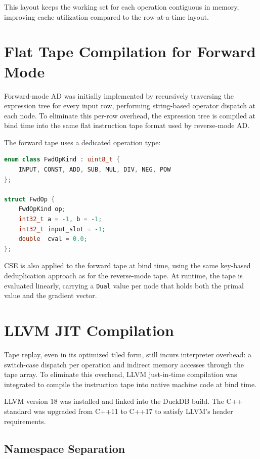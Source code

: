 \documentclass[12pt]{report}
\begin{document}
This layout keeps the working set for each operation contiguous in memory,
improving cache utilization compared to the row-at-a-time layout.

\section{Flat Tape Compilation for Forward Mode}

Forward-mode AD was initially implemented by recursively traversing the
expression tree for every input row, performing string-based operator dispatch
at each node. To eliminate this per-row overhead, the expression tree is
compiled at bind time into the same flat instruction tape format used by
reverse-mode AD.

The forward tape uses a dedicated operation type:

\begin{lstlisting}[language=C++]
enum class FwdOpKind : uint8_t {
    INPUT, CONST, ADD, SUB, MUL, DIV, NEG, POW
};

struct FwdOp {
    FwdOpKind op;
    int32_t a = -1, b = -1;
    int32_t input_slot = -1;
    double  cval = 0.0;
};
\end{lstlisting}

CSE is also applied to the forward tape at bind time, using the same key-based
deduplication approach as for the reverse-mode tape. At runtime, the tape is
evaluated linearly, carrying a \texttt{Dual} value per node that holds both
the primal value and the gradient vector.

\section{LLVM JIT Compilation}

Tape replay, even in its optimized tiled form, still incurs interpreter
overhead: a switch-case dispatch per operation and indirect memory accesses
through the tape array. To eliminate this overhead, LLVM just-in-time
compilation was integrated to compile the instruction tape into native machine
code at bind time.

LLVM version 18 was installed and linked into the DuckDB build. The C++
standard was upgraded from C++11 to C++17 to satisfy LLVM's header
requirements.

\subsection{Namespace Separation}
\end{document}
